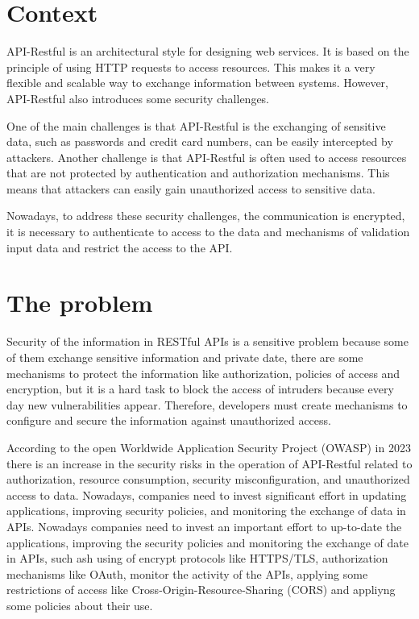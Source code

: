 \section{Context}

API-Restful is an architectural style for designing web services. It is based on the principle of using HTTP requests to access resources. This makes it a very flexible and scalable way to exchange information between systems. However, API-Restful also introduces some security challenges.

One of the main challenges is that API-Restful is the exchanging of sensitive data, such as passwords and credit card numbers, can be easily intercepted by attackers. Another challenge is that API-Restful is often used to access resources that are not protected by authentication and authorization mechanisms. This means that attackers can easily gain unauthorized access to sensitive data.

Nowadays, to address these security challenges, the communication is encrypted, it is necessary to authenticate to access to the data and mechanisms of validation input data and restrict the access to the API.


\section{The problem}

Security of the information in RESTful APIs is a sensitive problem because some of them exchange sensitive information and private date, there are some mechanisms to protect the information like authorization, policies of access and encryption, but it is a hard task to block the access of intruders because every day new vulnerabilities appear.  Therefore, developers must create mechanisms to configure and secure the information against unauthorized access.

According to the open Worldwide Application Security Project (OWASP) in 2023 there is an increase in the security risks in the operation of API-Restful related to authorization, resource consumption, security misconfiguration, and unauthorized access to data. Nowadays, companies need to invest significant effort in updating applications, improving security policies, and monitoring the exchange of data in APIs. Nowadays companies need to invest an important effort to up-to-date the applications, improving the security policies and monitoring the exchange of date in APIs, such ash using of encrypt protocols like HTTPS/TLS, authorization mechanisms like OAuth, monitor the activity of the APIs, applying some restrictions of access like Cross-Origin-Resource-Sharing (CORS) and appliyng some policies about their use\cite{Riggs2023}.

